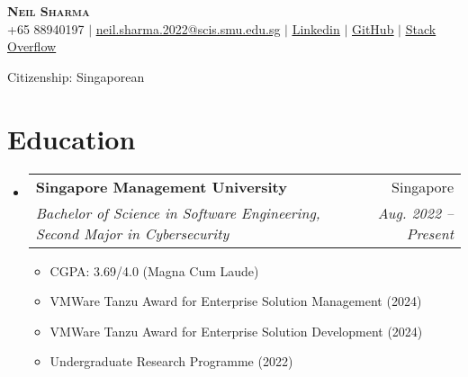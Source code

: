 \documentclass[letterpaper,11pt]{article}
\makeatletter
\newcommand{\resumeItem}[1]{
  \item\small{
    {#1 \vspace{-2pt}}
  }
}
\newcommand{\resumeSubheading}[4]{
  \vspace{-2pt}\item
    \begin{tabular*}{0.97\textwidth}[t]{l@{\extracolsep{\fill}}r}
      \textbf{#1} & #2 \\
      \textit{\small#3} & \textit{\small #4} \\
    \end{tabular*}\vspace{-7pt}
}
\newcommand{\resumeSubHeadingListStart}{\begin{itemize}[leftmargin=0.15in, label={}]}
\newcommand{\resumeSubHeadingListEnd}{\end{itemize}}
\newcommand{\resumeItemListStart}{\begin{itemize}}
\newcommand{\resumeItemListEnd}{\end{itemize}\vspace{-5pt}}
\makeatother
\begin{document}
\begin{center}
    \textbf{\Huge \scshape Neil Sharma} \\
    \small +65 88940197 $|$ \href{mailto:neil.sharma.2022@scis.smu.edu.sg}{\underline{neil.sharma.2022@scis.smu.edu.sg}} $|$ 
    \href{https://linkedin.com/in/neil-sharma-sg}{\underline{Linkedin}} $|$
   \href{https://github.com/neilscallywag}{\underline{GitHub}} $|$
\href{https://stackoverflow.com/users/16589387/neil}{\underline{Stack Overflow}}
 \vspace{1pt}

\small{Citizenship: Singaporean}
\end{center}

\section{Education}
  \resumeSubHeadingListStart
    \resumeSubheading
      {Singapore Management University}{Singapore}
      {Bachelor of Science in Software Engineering, Second Major in Cybersecurity}{Aug. 2022 -- Present}
 \resumeItemListStart
        \resumeItem{CGPA: 3.69/4.0 (Magna Cum Laude)}
        \resumeItem{VMWare Tanzu Award for Enterprise Solution Management (2024)}
        \resumeItem{VMWare Tanzu Award for Enterprise Solution Development (2024)}
        \resumeItem{Undergraduate Research Programme (2022)}
      \resumeItemListEnd
  \resumeSubHeadingListEnd

\end{document}
